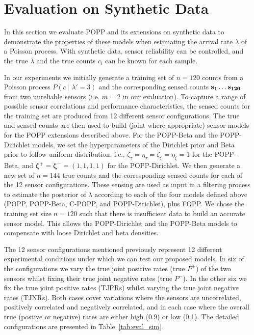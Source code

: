 
\section{Evaluation on Synthetic Data}
\label{sec:evasim}

In this section we evaluate POPP and its extensions on synthetic data to demonstrate the properties of these models when estimating the arrival rate $\lambda$ of a Poisson process. With synthetic data, sensor reliability can be controlled, and the true $\lambda$ and the true counts $c_i$ can be known for each sample.

In our experiments we initially generate a training set of $n=120$ counts from a Poisson process $P(c \mid \lambda'=3)$ and the corresponding sensed counts $\protect\mathbf{s_1} \ldots \protect\mathbf{s_{120}}$ from two unreliable sensors (i.e. $m=2$ in our evaluation). To capture a range of possible sensor correlations and performance characteristics, the sensed counts for the training set are produced from 12 different sensor configurations. The true and sensed counts are then used to build (joint where appropriate) sensor models for the POPP extensions described above. For the POPP-Beta and the POPP-Dirichlet models, we set the hyperparameters of the Dirichlet prior and Beta prior to follow uniform distribution, i.e., $\zeta_{\tau} = \eta_{\tau} = \zeta_{\xi} = \eta_{\xi} = 1$ for the POPP-Beta, and $\boldsymbol{\zeta^+} = \boldsymbol{\zeta^-} = (1, 1, 1, 1)$ for the POPP-Dirichlet. We then generate a new set of $n=144$ true counts and the corresponding sensed counts for each of the 12 sensor configurations. These sensing are used as input in a filtering process to estimate the posterior of $\lambda$ according to each of the four models defined above (POPP, POPP-Beta, C-POPP, and POPP-Dirichlet), plus FOPP.
% 
We chose the training set size $n=120$ such that there is insufficient data to build an accurate sensor model. This allows the POPP-Dirichlet and the POPP-Beta models to compensate with loose Dirichlet and beta densities. 

The 12 sensor configurations mentioned previously represent 12 different experimental conditions under which we can test our proposed models. In six of the configurations we vary the true joint positive rates (true $P^+$) of the two sensors whilst fixing their true joint negative rates (true $P^-$). In the other six we fix the true joint positive rates (TJPRs) whilst varying the true joint negative rates (TJNRs). Both cases cover variations where the sensors are uncorrelated, positively correlated and negatively correlated, and in each case where the overall true (postive or negative) rates are either high (0.9) or low (0.1). The detailed configurations are presented in Table~\ref{tab:eval_sim}. 

